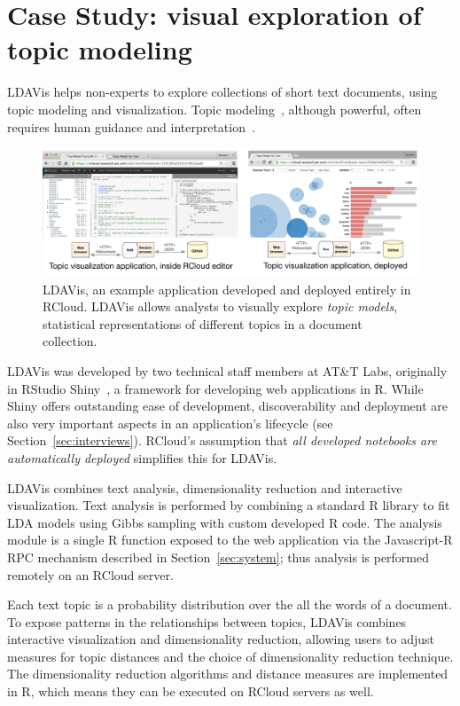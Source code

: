 \section{Case Study\label{sec:casestudy}: visual exploration of topic modeling}

LDAVis helps non-experts to explore collections of
short text documents, using topic modeling and
visualization. Topic modeling~\cite{Blei:2003:LDA},
although powerful, often requires human guidance
and interpretation~\cite{Sievert:2014:LAM}.

\begin{figure}
  \includegraphics[width=\linewidth]{fig/casestudytext/casestudytext.pdf}
  \caption{\label{fig:textvis}LDAVis, an example application developed
    and deployed entirely in RCloud.  LDAVis allows analysts to
    visually explore \emph{topic models}, statistical
    representations of different topics in a document collection.
  }
\end{figure}

LDAVis was developed by two technical staff members at
AT\&T Labs, originally in RStudio Shiny~\cite{RStudio:2013:SWA},
a framework for developing web applications in R.
While Shiny offers outstanding ease of development,
discoverability and deployment are also very important aspects
in an application's lifecycle (see Section~\ref{sec:interviews}).
RCloud's assumption that \emph{all developed notebooks are automatically
deployed} simplifies this for LDAVis.

LDAVis combines text analysis, dimensionality reduction and
interactive visualization. Text analysis is performed by
combining a standard R library to fit LDA models using
Gibbs sampling with custom developed R code.
The analysis module is a single R function
exposed to the web application via the Javascript-R RPC
mechanism described in Section~\ref{sec:system};
thus analysis is performed remotely on an RCloud server.

Each text topic is a probability distribution over the all the
words of a document. To expose patterns in the relationships
between topics, LDAVis combines
interactive visualization and dimensionality reduction,
allowing users to adjust measures for topic distances and the choice
of dimensionality reduction technique. The dimensionality reduction
algorithms and distance measures are implemented in R, which
means they can be executed on RCloud servers as well.

